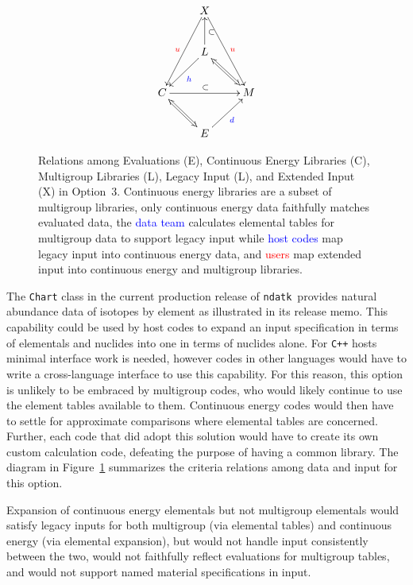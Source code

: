 \documentclass[12pt]{lamemo}
\newcommand{\ndatk}{\texttt{ndatk}}
\begin{document}
\begin{figure}\centering
\[
\xymatrix{
  & X \ar[ddl]_{\textcolor{red}{u}} \ar[ddr]^{\textcolor{red}{u}} & \\
  & L \ar[dl]^{\textcolor{blue}{h}} \ar@{<=>}[dr] \ar[u]_{\subset} & \\
  C \ar[rr]^{\subset} & & M \\
  & E \ar@{<=>}[ul] \ar[ur]_{\textcolor{blue}{d}} &
}
\]
\caption{Relations among Evaluations (E), Continuous Energy Libraries
  (C), Multigroup Libraries (L), Legacy Input (L), and Extended Input
  (X) in Option~3.  Continuous energy libraries are a subset of
  multigroup libraries, only continuous energy data faithfully matches
  evaluated data, the \textcolor{blue}{data team} calculates elemental
  tables for multigroup data to support legacy input while
  \textcolor{blue}{host codes} map legacy input into continuous energy
  data, and \textcolor{red}{users} map extended input into continuous
  energy and multigroup libraries.} \label{fig:3}
\end{figure}

The \texttt{Chart} class in the current production release of
\ndatk\ provides natural abundance data of isotopes by element as
illustrated in its release memo\cite[Appendix II]{gray14}.  This
capability could be used by host codes to expand an input
specification in terms of elementals and nuclides into one in terms of
nuclides alone.  For \texttt{C++} hosts minimal interface work is
needed, however codes in other languages would have to write a
cross-language interface to use this capability.  For this reason,
this option is unlikely to be embraced by multigroup codes, who would
likely continue to use the element tables available to them.
Continuous energy codes would then have to settle for approximate
comparisons where elemental tables are concerned.  Further, each code
that did adopt this solution would have to create its own custom
calculation code, defeating the purpose of having a common library.
The diagram in Figure~\ref{fig:3} summarizes the criteria relations
among data and input for this option.

Expansion of continuous energy elementals but not multigroup
elementals would satisfy legacy inputs for both multigroup (via
elemental tables) and continuous energy (via elemental expansion), but
would not handle input consistently between the two, would not
faithfully reflect evaluations for multigroup tables, and would not
support named material specifications in input.
\end{document}
